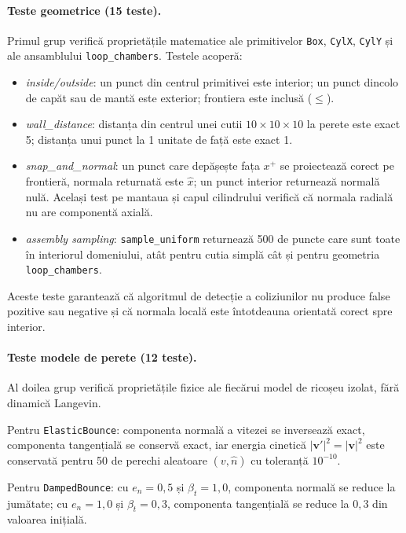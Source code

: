 \documentclass[12pt,openright,twoside]{book}
\begin{document}
\paragraph{Teste geometrice (15 teste).}
Primul grup verifică proprietățile matematice ale primitivelor \texttt{Box}, \texttt{CylX}, \texttt{CylY} și ale ansamblului \texttt{loop\_chambers}. Testele acoperă:

\begin{itemize}
    \item \emph{inside/outside}: un punct din centrul primitivei este interior; un punct dincolo de capăt sau de mantă este exterior; frontiera este inclusă ($\leq$).
    \item \emph{wall\_distance}: distanța din centrul unei cutii $10\times10\times10$ la perete este exact 5; distanța unui punct la 1 unitate de față este exact 1.
    \item \emph{snap\_and\_normal}: un punct care depășește fața $x^+$ se proiectează corect pe frontieră, normala returnată este $\hat{x}$; un punct interior returnează normală nulă. Același test pe mantaua și capul cilindrului verifică că normala radială nu are componentă axială.
    \item \emph{assembly sampling}: \texttt{sample\_uniform} returnează 500 de puncte care sunt toate în interiorul domeniului, atât pentru cutia simplă cât și pentru geometria \texttt{loop\_chambers}.
\end{itemize}

Aceste teste garantează că algoritmul de detecție a coliziunilor nu produce false pozitive sau negative și că normala locală este întotdeauna orientată corect spre interior.

\paragraph{Teste modele de perete (12 teste).}
Al doilea grup verifică proprietățile fizice ale fiecărui model de ricoșeu izolat, fără dinamică Langevin.

Pentru \texttt{ElasticBounce}: componenta normală a vitezei se inversează exact, componenta tangențială se conservă exact, iar energia cinetică $|\mathbf{v}'|^2 = |\mathbf{v}|^2$ este conservată pentru 50 de perechi aleatoare $(v, \hat{n})$ cu toleranță $10^{-10}$.

Pentru \texttt{DampedBounce}: cu $e_n = 0{,}5$ și $\beta_t = 1{,}0$, componenta normală se reduce la jumătate; cu $e_n = 1{,}0$ și $\beta_t = 0{,}3$, componenta tangențială se reduce la $0{,}3$ din valoarea inițială.
\end{document}
